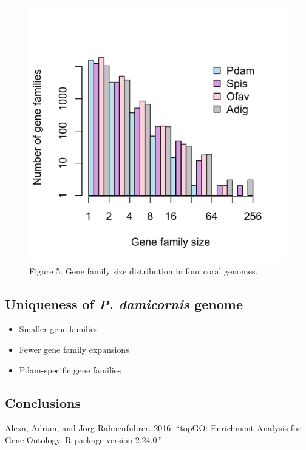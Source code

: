 \documentclass[]{elsarticle} %
\makeatletter
\providecommand{\tightlist}{%
  \setlength{\itemsep}{0pt}\setlength{\parskip}{0pt}}
\def\maxwidth{\ifdim\Gin@nat@width>\linewidth\linewidth
\else\Gin@nat@width\fi}
\let\Oldincludegraphics\includegraphics
\renewcommand{\includegraphics}[1]{\Oldincludegraphics[width=\maxwidth]{#1}}
\makeatother
\begin{document}
\begin{figure}
\centering
\includegraphics{../figures/gene_family_size.png}
\caption{Figure 5. Gene family size distribution in four coral genomes.}
\end{figure}

\subsection{\texorpdfstring{Uniqueness of \emph{P. damicornis}
genome}{Uniqueness of P. damicornis genome}}\label{uniqueness-of-p.-damicornis-genome}

\begin{itemize}
\tightlist
\item
  Smaller gene families
\item
  Fewer gene family expansions
\item
  Pdam-specific gene families
\end{itemize}

\subsection*{Conclusions}\label{conclusions}

\hypertarget{refs}{}
\hypertarget{ref-Alexa2016}{}
Alexa, Adrian, and Jorg Rahnenfuhrer. 2016. ``topGO: Enrichment Analysis
for Gene Ontology. R package version 2.24.0.''
\end{document}
